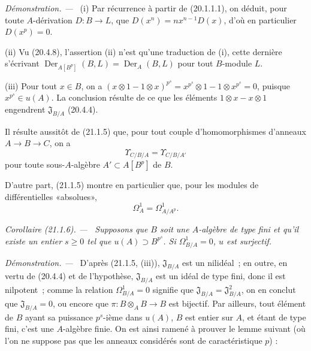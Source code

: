 \documentclass[10pt,oneside]{book}
\makeatletter
\newcommand{\setmanualcurrentlabel}[1]{\def\@currentlabel{#1}}
\newcommand{\oldpage}[2][]{%
  \setcounter{footnote}{0}%
  \marginpar{\scriptsize\textbf{#1}~|~#2}\ignorespaces}
\newenvironment{corollary}[1][]{%
  \setmanualcurrentlabel{#1}\par\medskip\noindent\itshape Corollaire (#1). ---\ }{\par}
\newenvironment{proof}{%
  \par\medskip\noindent\textit{Démonstration. ---\ }}{\par}
\makeatother
\begin{document}
\begin{proof}
(i) Par récurrence à partir de (20.1.1.1), on déduit, pour toute
$A$-dérivation $D:B\to L$, que $D(x^n)=nx^{n-1}D(x)$, d'où en particulier
$D(x^p)=0$.

(ii) Vu (20.4.8), l'assertion (ii) n'est qu'une traduction de (i), cette
dernière s'écrivant $\operatorname{Der}_{A[B^p]}(B,L)=\operatorname{Der}_A(B,L)$
pour tout $B$-module $L$.

(iii) Pour tout $x\in B$, on a
$(x\otimes1-1\otimes x)^{p^s}=x^{p^s}\otimes1-1\otimes x^{p^s}=0$,
puisque $x^{p^s}\in u(A)$. La conclusion résulte de ce que les éléments
$1\otimes x-x\otimes1$ engendrent $\mathfrak J_{B/A}$ (20.4.4).
\end{proof}

Il résulte aussitôt de (21.1.5) que, pour tout couple d'homomorphismes
d'anneaux $A\to B\to C$, on a
\begin{equation}
\tag{21.1.5.1}
\label{0.21.1.5.1-fr}
\Upsilon_{C/B/A}=\Upsilon_{C/B/A'}
\end{equation}
pour toute sous-$A$-algèbre $A'\subset A[B^p]$ de $B$.

D'autre part, (21.1.5) montre en particulier que, pour les modules de
différentielles «absolues»,
\begin{equation}
\tag{21.1.5.2}
\label{0.21.1.5.2-fr}
\Omega^1_A=\Omega^1_{A/A^p}.
\end{equation}

\begin{corollary}[21.1.6]
\label{0.21.1.6-fr}
Supposons que $B$ soit une $A$-algèbre de type fini et qu'il existe un
entier $s\geq0$ tel que $u(A)\supset B^{p^s}$. Si $\Omega^1_{B/A}=0$,
$u$ est surjectif.
\end{corollary}

\begin{proof}
\oldpage[0\textsubscript{IV-1}]{156}
D'après (21.1.5, (iii)), $\mathfrak J_{B/A}$ est un nilidéal~; en outre,
en vertu de (20.4.4) et de l'hypothèse, $\mathfrak J_{B/A}$ est un idéal de
type fini, donc il est nilpotent~; comme la relation $\Omega^1_{B/A}=0$
signifie que $\mathfrak J_{B/A}=\mathfrak J_{B/A}^2$, on en conclut que
$\mathfrak J_{B/A}=0$, ou encore que $\pi:B\otimes_A B\to B$ est bijectif.
Par ailleurs, tout élément de $B$ ayant sa puissance $p^s$-ième dans $u(A)$,
$B$ est entier sur $A$, et étant de type fini, c'est une $A$-algèbre finie.
On est ainsi ramené à prouver le lemme suivant (où l'on ne suppose pas que
les anneaux considérés sont de caractéristique $p$) :
\end{proof}
\end{document}

